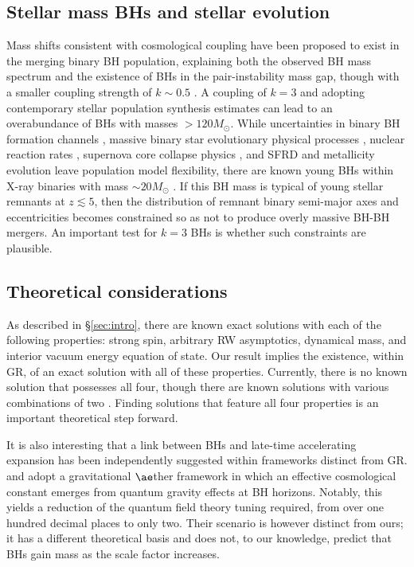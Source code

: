 \documentclass[twocolumn,twocolappendix]{aastex631}
\begin{document}
\subsection{Stellar mass BHs and stellar evolution}
Mass shifts consistent with cosmological coupling have been proposed to exist in the merging binary BH population, explaining both the observed BH mass spectrum and the existence of BHs in the pair-instability mass gap, though with a smaller coupling strength of $k\sim0.5$ \citep{cro21}.
A coupling of $k=3$ and adopting contemporary stellar population synthesis estimates can lead to an overabundance of BHs with masses $>120M_\odot$.
While uncertainties in binary BH formation channels \citep{Mandel_2022,zevin21}, massive binary star evolutionary physical processes \citep{Broekgaarden_2022}, nuclear reaction rates \citep{2020ApJ...902L..36F}, supernova core collapse physics \citep{Patton_2020}, and SFRD and metallicity evolution \citep{arxiv.2206.10622} leave population model flexibility, there are known young BHs within X-ray binaries with mass $\sim 20M_\odot$ \citep[e.g.][]{millerjones2021cygnus}. 
If this BH mass is typical of young stellar remnants at $z \lesssim 5$, then the distribution of remnant binary semi-major axes and eccentricities becomes constrained so as not to produce overly massive BH-BH mergers.
An important test for $k=3$ BHs is whether such constraints are plausible.

\subsection{Theoretical considerations}
\label{sec:exact_solutions}
As described in \S\ref{sec:intro}, there are known exact solutions with each of the following properties: strong spin, arbitrary RW asymptotics, dynamical mass, and interior vacuum energy equation of state.
Our result implies the existence, within GR, of an exact solution with all of these properties.
Currently, there is no known solution that possesses all four, though there are known solutions with various combinations of two \citep[e.g.][]{guariento2012realistic, dymnikova2016regular}.
Finding solutions that feature all four properties is an important theoretical step forward.

It is also interesting that a link between BHs and late-time accelerating expansion has been independently suggested within frameworks distinct from GR. 
\citet{afshordi2008gravitational} and \citet{prewei09} adopt a gravitational $\ae$ther framework in which an effective cosmological constant emerges from quantum gravity effects at BH horizons. 
Notably, this yields a reduction of the quantum field theory tuning required, from over one hundred decimal places to only two. 
Their scenario is however distinct from ours; it has a different theoretical basis and does not, to our knowledge, predict that BHs gain mass as the scale factor increases.
\end{document}

